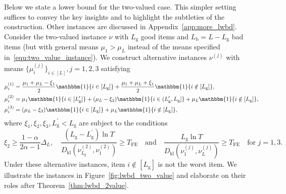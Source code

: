 \documentclass[twoside,11pt]{article}
\newcommand{\kl}{D_{\mathrm{kl}}}
\newcommand{\rmb}{\mathrm{b}}
\newcommand{\rmg}{\mathrm{g}}
\newcommand{\Tfe}{T_{\mathrm{FE}}}
\begin{document}
Below we state a lower bound for the two-valued case. This simpler setting suffices to convey the key insights and to highlight the subtleties of the construction. 
Other instances are discussed in Appendix~\ref{app:more_lwbd}. Consider the two-valued instance $\nu$ with $L_{\rmg}$ good items and $L_{\rmb}=L-L_{\rmg}$ bad items (but with general means $\mu_1>\mu_L$ instead of the means specified in~\eqref{equ:two_value_instance}). We construct alternative instances $\nu^{(j)}$ with means $\{\mu_i^{(j)}\}_{i\in[L]},j=1,2,3$ satisfying
\begin{align}
    &\mu_i^{(1)}=
        \frac{\mu_1+\mu_L-\xi_1}{2}\mathbbm{1}\{i\in[L_{\rmg}]\}+\frac{\mu_1+\mu_L+\xi_1}{2}\mathbbm{1}\{i\notin[L_{\rmg}]\},
        \\
    &\mu_i^{(2)}=\mu_1\mathbbm{1}\{i\in[L_{\rmg}^\prime]\}
            +(\mu_L-\xi_2)\mathbbm{1}\{i\in(L_{\rmg}^\prime,L_{\rmg}]\}
        +\mu_L\mathbbm{1}\{i\notin[L_{\rmg}]\},\label{eqn:two_valued}
        \\
    &\mu_i^{(3)}=(\mu_L-\xi_3)\mathbbm{1}\{i\in[L_{\rmg}]\}
        +\mu_L\mathbbm{1}\{i\notin[L_{\rmg}]\}, 
\end{align}
where $\xi_1,\xi_2, \xi_3,L_{\rmg}^\prime<L_{\rmg}$ are subject to the conditions  
\begin{equation}
    \xi_2\geq\frac{1-\alpha}{2\alpha-1}\Delta_L,\quad \frac{(L_{\rmg}-L_{\rmg}^\prime)\ln T}{\kl(\nu_{L_{\rmg}}^{(2)},\nu_1^{(2)})}\geq \Tfe\quad\mbox{and}\quad \frac{L_{\rmg}\ln T}{\kl(\nu_{1}^{(j)},\nu_L^{(j)})}\geq \Tfe \quad  \mbox{for } j=1,3 .
\end{equation}
 Under these alternative instances, item $i\notin[L_{\rmg}]$ is not the worst item. We illustrate the instances in Figure~\ref{fig:lwbd_two_value} and elaborate  on their roles after Theorem~\ref{thm:lwbd_2value}.
\end{document}
